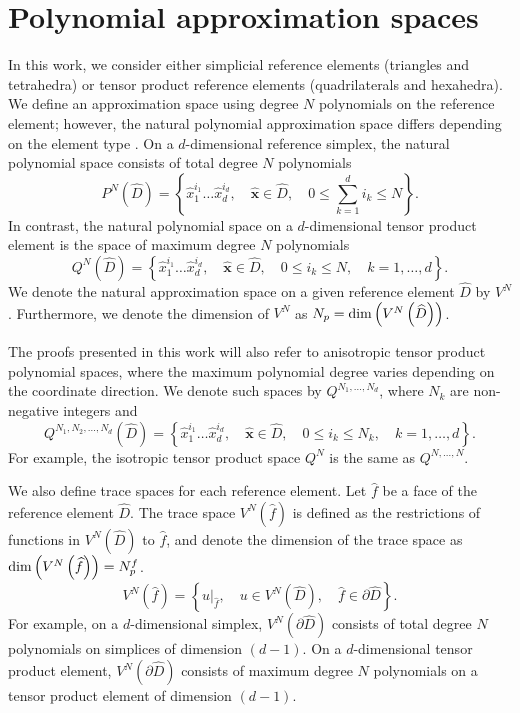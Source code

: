 \documentclass{svjour3}                     %
\renewcommand{\hat}{\widehat}
\newcommand{\LRp}[1]{\left( #1 \right)}
\newcommand{\LRc}[1]{\left\{ #1 \right\}}
\begin{document}
\section{Polynomial approximation spaces}
\label{sec:approx}

In this work, we consider either simplicial reference elements (triangles and tetrahedra) or tensor product reference elements (quadrilaterals and hexahedra).  We define an approximation space using degree $N$ polynomials on the reference element; however, the natural polynomial approximation space differs depending on the element type \cite{chan2015gpu}.  On a $d$-dimensional reference simplex, the natural polynomial space consists of total degree $N$ polynomials 
\[
P^N\LRp{\hat{D}} = \LRc{\hat{x}_1^{i_1}\ldots\hat{x}_d^{i_d}, \quad \hat{\bm{x}} \in \hat{D}, \quad 0\leq \sum_{k=1}^d i_k \leq N}.
\]
In contrast, the natural polynomial space on a $d$-dimensional tensor product element is the space of maximum degree $N$ polynomials
\[
Q^N\LRp{\hat{D}} = \LRc{\hat{x}_1^{i_1}\ldots\hat{x}_d^{i_d}, \quad \hat{\bm{x}} \in \hat{D}, \quad 0\leq i_k \leq N, \quad k = 1,\ldots, d}.
\]
We denote the natural approximation space on a given reference element $\hat{D}$ by $V^N$.  Furthermore, we denote the dimension of $V^N$ as $N_p = {\rm dim}\LRp{V^N\LRp{\hat{D}}}$.  

The proofs presented in this work will also refer to anisotropic tensor product polynomial spaces, where the maximum polynomial degree varies depending on the coordinate direction.  We denote such spaces by $Q^{N_1, \ldots, N_d}$, where $N_k$ are non-negative integers and
\[
Q^{N_1, N_2, \ldots, N_d}\LRp{\hat{D}} = \LRc{\hat{x}_1^{i_1}\ldots\hat{x}_d^{i_d}, \quad \hat{\bm{x}} \in \hat{D}, \quad 0\leq i_k \leq N_k, \quad k = 1,\ldots, d}.
\]
For example, the isotropic tensor product space $Q^N$ is the same as $Q^{N,\ldots,N}$.

We also define trace spaces for each reference element.  Let $\hat{f}$ be a face of the reference element $\hat{D}$.  The trace space $V^N \LRp{\hat{f}}$ is defined as the restrictions of functions in $V^N\LRp{\hat{D}}$ to $\hat{f}$, and denote the dimension of the trace space as ${\rm dim}\LRp{V^N\LRp{{\hat{f}}}} = N^f_p$.  
\[
V^N \LRp{\hat{f}} = \LRc{ \left.u\right|_{\hat{f}}, \quad u \in V^N\LRp{\hat{D}}, \quad \hat{f}\in \partial\hat{D}}.
\]
For example, on a $d$-dimensional simplex, $V^N \LRp{\partial \hat{D}}$ consists of total degree $N$ polynomials on simplices of dimension $(d-1)$.  On a $d$-dimensional tensor product element, $V^N \LRp{\partial \hat{D}}$ consists of maximum degree $N$ polynomials on a tensor product element of dimension $(d-1)$.  
\end{document}
